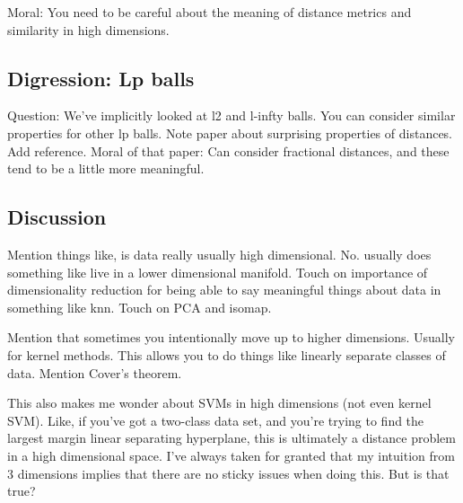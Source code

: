 \documentclass{book}
\begin{document}
Moral: You need to be careful about the meaning of distance metrics and similarity in high dimensions. 

\subsection{Digression: Lp balls}
Question: We've implicitly looked at l2 and l-infty balls. You can consider similar properties for other lp balls. Note paper about surprising properties of distances. Add reference. Moral of that paper: Can consider fractional distances, and these tend to be a little more meaningful. 

\subsection{Discussion}
Mention things like, is data really usually high dimensional. No. usually does something like live in a lower dimensional manifold. Touch on importance of dimensionality reduction for being able to say meaningful things about data in something like knn. Touch on PCA and isomap. 

Mention that sometimes you intentionally move up to higher dimensions. Usually for kernel methods. This allows you to do things like linearly separate classes of data. Mention Cover's theorem. 

This also makes me wonder about SVMs in high dimensions (not even kernel SVM). Like, if you've got a two-class data set, and you're trying to find the largest margin linear separating hyperplane, this is ultimately a distance problem in a high dimensional space. I've always taken for granted that my intuition from 3 dimensions implies that there are no sticky issues when doing this. But is that true? 
\end{document}
